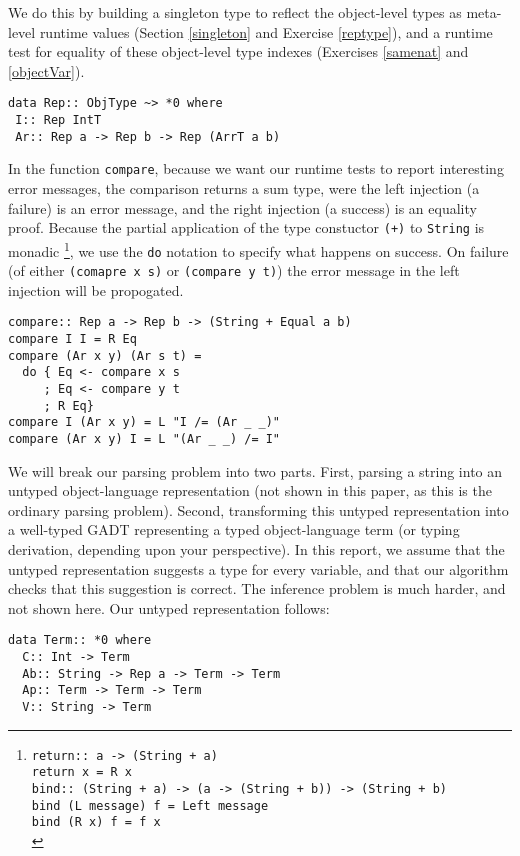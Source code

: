 \documentclass[11pt,twoside,A4]{llncs}
\begin{document}
 We do this by building a singleton type to reflect the
 object-level types as meta-level runtime values
 (Section \ref{singleton} and Exercise \ref{reptype}), and a runtime test for equality
 of these object-level type indexes (Exercises \ref{samenat} and \ref{objectVar}).
 
{\small
\begin{verbatim}
data Rep:: ObjType ~> *0 where
 I:: Rep IntT
 Ar:: Rep a -> Rep b -> Rep (ArrT a b)
\end{verbatim}}

In the function
{\tt compare}, because we want our runtime tests to report interesting error
messages, the comparison returns a sum type, were the left injection (a
failure) is an error message, and the right injection (a success) is an
equality proof. Because the partial application of the type constuctor
{\tt (+)} to {\tt String} is monadic
\footnote{{\tt return:: a -> (String + a)\\
return x = R x\\
bind:: (String + a) -> (a -> (String + b)) -> (String + b)\\
bind (L message) f = Left message\\
bind (R x) f = f x\\}}, we use the {\tt do} notation
to specify what happens on success. On failure
(of either {\tt (comapre x s)} or {\tt (compare y t)}) the error message
in the left injection will be propogated.

{\small
\begin{verbatim}
compare:: Rep a -> Rep b -> (String + Equal a b)
compare I I = R Eq
compare (Ar x y) (Ar s t) =
  do { Eq <- compare x s
     ; Eq <- compare y t
     ; R Eq}
compare I (Ar x y) = L "I /= (Ar _ _)"
compare (Ar x y) I = L "(Ar _ _) /= I"
\end{verbatim}}


We will break our parsing problem into two parts. First, parsing a string
into an untyped object-language representation (not shown in this paper,
as this is the ordinary parsing problem). Second, transforming
this untyped representation into a well-typed GADT representing
a typed object-language term (or typing derivation, depending upon
your perspective). In this report, we assume that the untyped
representation suggests a type for every variable, and that
our algorithm checks that this suggestion is correct. The inference
problem is much harder, and not shown here. Our untyped
representation follows:

{\small
\begin{verbatim}
data Term:: *0 where
  C:: Int -> Term
  Ab:: String -> Rep a -> Term -> Term
  Ap:: Term -> Term -> Term
  V:: String -> Term
\end{verbatim}}
\end{document}
